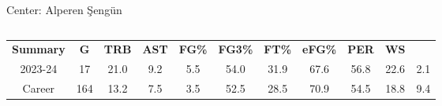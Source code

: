 \begin{frame}{Center: Alperen Şengün}
    \pause
    \begin{columns}
        \begin{column}{0.4\textwidth}
            \begin{table}[h]
                \small
                \centering
                \begin{tabular}{ c|cccc|cccc|cc }
                    \textbf{Summary} & \textbf{G} &\textbf{TRB} &\textbf{AST} & \textbf{FG\%} & \textbf{FG3\%} &\textbf{FT\%} &\textbf{eFG\%} & \textbf{PER} & \textbf{WS} \\
                    2023-24 & 17 & 21.0 & 9.2 & 5.5 & 54.0 & 31.9 & 67.6 & 56.8 & 22.6 & 2.1 \\
                    \pause
                    Career & 164 & 13.2 & 7.5 & 3.5 & 52.5 & 28.5 & 70.9 & 54.5 & 18.8 & 9.4 \\
                \end{tabular}
                \label{fig:player-statistics}
            \end{table}
        \end{column}
        \begin{column}{0.3\textwidth}
            \begin{figure}[t]
                \vspace{-14em}
                \label{fig:Jalen-Green}
            \end{figure}
        \end{column}
    \end{columns}
\end{frame}



